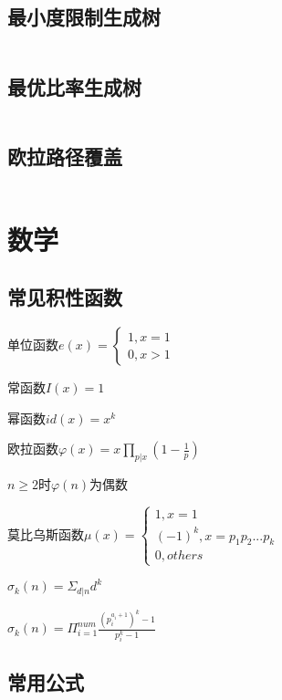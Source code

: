 \documentclass[UTF8]{ctexart}
\begin{document}
\subsection{最小度限制生成树}
\inputminted{cpp}{graphtheory/最小度限制生成树.cpp}
\subsection{最优比率生成树}
\inputminted{cpp}{graphtheory/最优比率生成树.cpp}
\subsection{欧拉路径覆盖}
\inputminted{cpp}{graphtheory/欧拉路径覆盖.cpp}

\section{数学}

\subsection{常见积性函数}

单位函数$e(x)= \begin{cases}
	1,x=1 \\ 0,x>1
\end{cases}$\par

常函数$I(x)=1$\par

幂函数$id(x)=x^k$\par

欧拉函数$\varphi(x)=x\prod_{p|x}(1-\frac{1}{p})$\par

$n\geq 2$时$\varphi(n)$为偶数\par

莫比乌斯函数$\mu(x)=\begin{cases}
	1,x=1\\(-1)^k,x=p_1p_2...p_k \\ 0,others
\end{cases}$\par

$\sigma_k(n) = \Sigma_{d|n}d^k$\par

$\sigma_k(n)=\Pi_{i=1}^{num}\frac{(p_i^{a_i+1})^k-1}{p_i^k-1}$\par

\subsection{常用公式}
\end{document}
